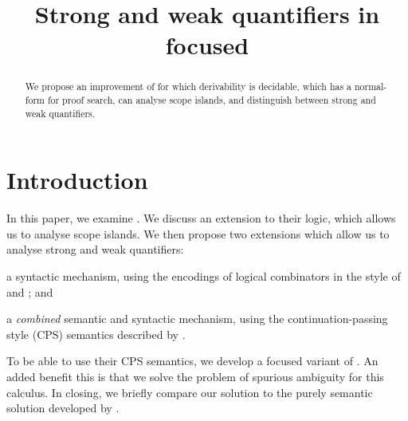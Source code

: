 \documentclass[10pt,a4paper]{llncs}
\begin{document}
\mainmatter%
\title{Strong and weak quantifiers in focused \NLCL}
\maketitle

\begin{abstract}
  We propose an improvement of  {\NLCL} for which
  derivability is decidable, which has a normal-form for proof search,
  can analyse scope islands, and distinguish between strong and weak
  quantifiers.
\end{abstract}


\section{Introduction}\label{sec:introduction}
In this paper, we examine  {\NLCL}. We discuss an
extension to their logic, which allows us to analyse scope islands.
We then propose two extensions which allow us to analyse strong and
weak quantifiers:
\begin{enumerate*}[label= (\arabic*)]
\item a syntactic mechanism, using the encodings of logical
  combinators in the style of \citet{finger2001} and
  \citet{barker2015}; and
\item a \emph{combined} semantic and syntactic mechanism, using the
  continuation-passing style (CPS) semantics described by
  \citet{moortgat2012}.
\end{enumerate*}
To be able to use their CPS semantics, we develop a focused variant of
{\NLCL}. An added benefit this is that we solve the problem of spurious
ambiguity for this calculus. In closing, we briefly compare our solution
to the purely semantic solution developed by \citet{kiselyov2014}.
\end{document}
